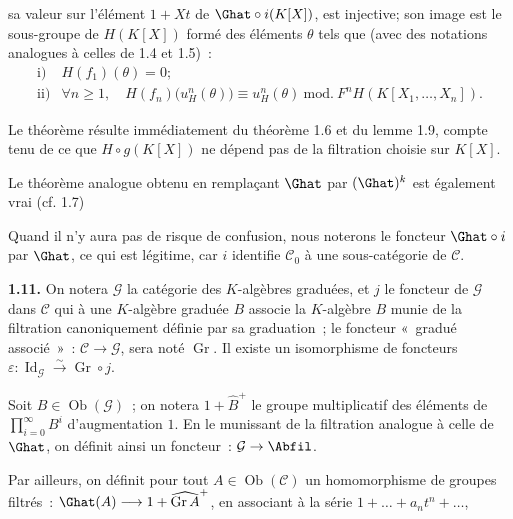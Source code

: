 sa valeur sur l'élément \(1+Xt\) de \(\Ghat\circ i(K[X])\), est injective; son image est le sous-groupe de \(H(K[X])\) formé des éléments \(\theta\) tels que (avec des notations analogues à celles de 1.4 et 1.5)~:
\[
\begin{array}{ll}
\text{i)}& H(f_1)(\theta)=0;\\[0.3em]
\text{ii)}& \forall n\geq1,\quad
H(f_n)\bigl(u_H^n(\theta)\bigr)\equiv u_H^n(\theta)
\ \mathrm{mod.}\ F^nH(K[X_1,\ldots,X_n]).
\end{array}
\]

Le théorème résulte immédiatement du théorème 1.6 et du lemme 1.9, compte tenu de ce que \(H\circ g(K[X])\) ne dépend pas de la filtration choisie sur \(K[X]\).

Le théorème analogue obtenu en remplaçant \(\Ghat\) par \((\Ghat)^k\) est également vrai (cf. 1.7)

Quand il n'y aura pas de risque de confusion, nous noterons le foncteur \(\Ghat\circ i\) par \(\Ghat\), ce qui est légitime, car \(i\) identifie \(\mathcal C_0\) à une sous-catégorie de \(\mathcal C\).

\textbf{1.11.} On notera \(\mathcal G\) la catégorie des \(K\)-algèbres graduées, et \(j\) le foncteur de \(\mathcal G\) dans \(\mathcal C\) qui à une \(K\)-algèbre graduée \(B\) associe la \(K\)-algèbre \(B\) munie de la filtration canoniquement définie par sa graduation~; le foncteur «~gradué associé~»~: \(\mathcal C\to\mathcal G\), sera noté \(\operatorname{Gr}\). Il existe un isomorphisme de foncteurs \(\varepsilon:\operatorname{Id}_{\mathcal G}\xrightarrow{\sim}\operatorname{Gr}\circ j\).

Soit \(B\in\operatorname{Ob}(\mathcal G)\)~; on notera \(1+\widehat B^+\) le groupe multiplicatif des éléments de \(\prod\limits_{i=0}^{\infty}B^i\) d'augmentation \(1\). En le munissant de la filtration analogue à celle de \(\Ghat\), on définit ainsi un foncteur~: \(\mathcal G\to\Abfil\).

Par ailleurs, on définit pour tout \(A\in\operatorname{Ob}(\mathcal C)\) un homomorphisme de groupes filtrés~: \(\Ghat(A)\longrightarrow 1+\widehat{\operatorname{Gr}A}^{+}\), en associant à la série \(1+\ldots+a_nt^n+\ldots\), 
